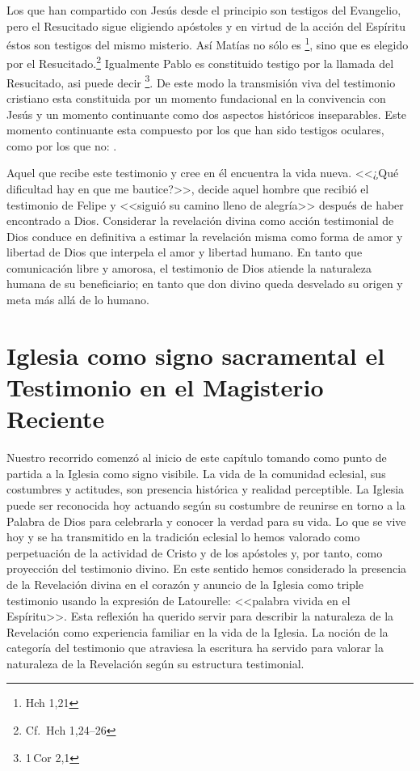 Los que han compartido con Jesús desde el principio son testigos del Evangelio,
pero el Resucitado sigue eligiendo apóstoles y en virtud de la acción del
Espíritu éstos son testigos del mismo misterio.\autocite[Cf.][576]{ninot2009tf}
Así Matías no sólo es \footnote{Hch 1,21}, sino que
es elegido por el Resucitado.\footnote{Cf.~Hch 1,24--26} Igualmente Pablo es
constituido testigo por la llamada del Resucitado, asi puede decir
\footnote{1\,Cor 2,1}. De este modo la transmisión
viva del testimonio cristiano esta constituida por un momento fundacional en la
convivencia con Jesús y un momento continuante como dos aspectos históricos
inseparables.\autocite[Cf.][148]{prades2015testimonio} Este momento continuante
esta compuesto por los que han sido testigos oculares, como por los que no:
.\autocite[148]{prades2015testimonio}

Aquel que recibe este testimonio y cree en él encuentra la vida nueva. <<¿Qué
dificultad hay en que me bautice?>>, decide aquel hombre que recibió el
testimonio de Felipe y <<siguió su camino lleno de alegría>> después de haber
encontrado a Dios. Considerar la revelación divina como acción testimonial de
Dios conduce en definitiva a estimar la revelación misma como forma de amor y
libertad de Dios que interpela el amor y libertad humano. En tanto que
comunicación libre y amorosa, el testimonio de Dios atiende la naturaleza humana
de su beneficiario; en tanto que don divino queda desvelado su origen y meta más
allá de lo humano.\autocite[Cf.][152]{prades2015testimonio}

\section{Iglesia como signo sacramental el Testimonio en el Magisterio Reciente}
Nuestro recorrido comenzó al inicio de este capítulo tomando como punto de
partida a la Iglesia como signo visibile. La vida de la comunidad eclesial, sus
costumbres y actitudes, son presencia histórica y realidad perceptible. La
Iglesia puede ser reconocida hoy actuando según su costumbre de reunirse en
torno a la Palabra de Dios para celebrarla y conocer la verdad para su vida. Lo
que se vive hoy y se ha transmitido en la tradición eclesial lo hemos valorado
como perpetuación de la actividad de Cristo y de los apóstoles y, por tanto,
como proyección del testimonio divino. En este sentido hemos considerado la
presencia de la Revelación divina en el corazón y anuncio de la Iglesia como
triple testimonio usando la expresión de Latourelle: <<palabra vivida en el
Espíritu>>. Esta reflexión ha querido servir para describir la naturaleza de la
Revelación como experiencia familiar en la vida de la Iglesia. La noción de la
categoría del testimonio que atraviesa la escritura ha servido para valorar la
naturaleza de la Revelación según su estructura testimonial.

